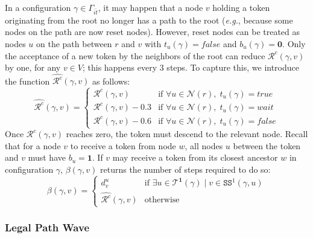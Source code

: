 \documentclass[a4paper, 12pt]{article}
\newcommand{\Neig}{\mathcal{N}}
\newcommand{\bz}{\mathbf{0}}
\newcommand{\bo}{\mathbf{1}}
\newcommand{\Ss}{\texttt{SS}^1}
\begin{document}
In a configuration $\gamma \in \Gamma_{\bar{it}}$, it may happen that a node 
$v$ holding a token originating from the root no longer has a path to 
the root (\textit{e.g.}, because some nodes on the path are now reset 
nodes). However, reset nodes can be treated as nodes $u$ on the path 
between $r$ and $v$ with $t_u(\gamma) = \mathit{false}$ and 
$b_u(\gamma) = \bz$. Only the acceptance of a new token by the neighbors 
of the root can reduce $\mathcal{R}^c(\gamma, v)$ by one, for any 
$v \in V$; this happens every $3$ steps. To capture this, we introduce 
the function $\widehat{\mathcal{R}^c}(\gamma, v)$ as follows:
\begin{equation}
    \widehat{\mathcal{R}^c}(\gamma, v) =
    \begin{cases}
        \mathcal{R}^c(\gamma,v) & 
            \text{if } \forall u \in \Neig(r),\; t_u(\gamma) = \mathit{true}\\
        \mathcal{R}^c(\gamma,v) - 0.3 & 
            \text{if } \forall u \in \Neig(r),\; t_u(\gamma) = \mathit{wait}\\
        \mathcal{R}^c(\gamma,v) - 0.6 & 
            \text{if } \forall u \in \Neig(r),\; t_u(\gamma) = \mathit{false}
    \end{cases}
    \label{eq:hatRc}
\end{equation}
Once $\mathcal{R}^c(\gamma, v)$ reaches zero, the token must descend to 
the relevant node. Recall that for a node $v$ to receive a token from 
node $w$, all nodes $u$ between the token and $v$ must have $b_u = \bo$. 
If $v$ may receive a token from its closest ancestor $w$ in configuration 
$\gamma$, $\beta(\gamma, v)$ returns the number of steps required to 
do so:
\begin{equation}
    \beta(\gamma, v) =
    \begin{cases}
        d^u_v & \text{if } \exists u \in \mathcal{T}^{\bo}(\gamma) 
                \mid v \in \Ss(\gamma, u) \\
        \widehat{\mathcal{R}^c}(\gamma,v) & \text{otherwise}
    \end{cases}
\end{equation}

\subsubsection{Legal Path Wave}
\label{subsub:legalpath}
\end{document}

